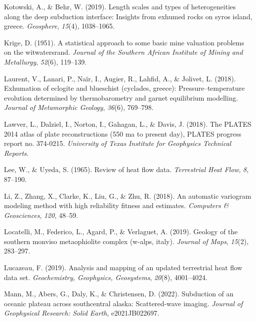 \begin{CSLReferences}{1}{1}
\leavevmode{}%
Kotowski, A., \& Behr, W. (2019). Length scales and types of heterogeneities along the deep subduction interface: Insights from exhumed rocks on syros island, greece. \emph{Geosphere}, \emph{15}(4), 1038--1065.

\leavevmode{}%
Krige, D. (1951). A statistical approach to some basic mine valuation problems on the witwatersrand. \emph{Journal of the Southern African Institute of Mining and Metallurgy}, \emph{52}(6), 119--139.

\leavevmode{}%
Laurent, V., Lanari, P., Naïr, I., Augier, R., Lahfid, A., \& Jolivet, L. (2018). Exhumation of eclogite and blueschist (cyclades, greece): Pressure--temperature evolution determined by thermobarometry and garnet equilibrium modelling. \emph{Journal of Metamorphic Geology}, \emph{36}(6), 769--798.

\leavevmode{}%
Lawver, L., Dalziel, I., Norton, I., Gahagan, L., \& Davis, J. (2018). The PLATES 2014 atlas of plate reconstructions (550 ma to present day), PLATES progress report no. 374-0215. \emph{University of Texas Institute for Geophysics Technical Reports}.

\leavevmode{}%
Lee, W., \& Uyeda, S. (1965). Review of heat flow data. \emph{Terrestrial Heat Flow}, \emph{8}, 87--190.

\leavevmode{}%
Li, Z., Zhang, X., Clarke, K., Liu, G., \& Zhu, R. (2018). An automatic variogram modeling method with high reliability fitness and estimates. \emph{Computers \& Geosciences}, \emph{120}, 48--59.

\leavevmode{}%
Locatelli, M., Federico, L., Agard, P., \& Verlaguet, A. (2019). Geology of the southern monviso metaophiolite complex (w-alps, italy). \emph{Journal of Maps}, \emph{15}(2), 283--297.

\leavevmode{}%
Lucazeau, F. (2019). Analysis and mapping of an updated terrestrial heat flow data set. \emph{Geochemistry, Geophysics, Geosystems}, \emph{20}(8), 4001--4024.

\leavevmode{}%
Mann, M., Abers, G., Daly, K., \& Christensen, D. (2022). Subduction of an oceanic plateau across southcentral alaska: Scattered-wave imaging. \emph{Journal of Geophysical Research: Solid Earth}, e2021JB022697.


\end{CSLReferences}
